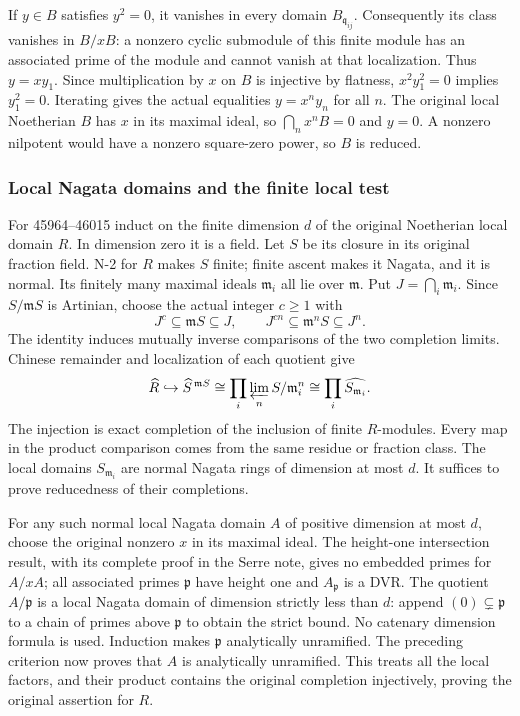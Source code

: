 If \(y\in B\) satisfies \(y^2=0\), it vanishes in every domain \(B_{\mathfrak q_{ij}}\). Consequently its class vanishes in \(B/xB\): a nonzero cyclic submodule of this finite module has an associated prime of the module and cannot vanish at that localization. Thus \(y=xy_1\). Since multiplication by \(x\) on \(B\) is injective by flatness, \(x^2y_1^2=0\) implies \(y_1^2=0\). Iterating gives the actual equalities \(y=x^n y_n\) for all \(n\). The original local Noetherian \(B\) has \(x\) in its maximal ideal, so \(\bigcap_n x^nB=0\) and \(y=0\). A nonzero nilpotent would have a nonzero square-zero power, so \(B\) is reduced.

\subsubsection{Local Nagata domains and the finite local test}\label{local-nagata-domains-and-the-finite-local-test}

For 45964--46015 induct on the finite dimension \(d\) of the original Noetherian local domain \(R\). In dimension zero it is a field. Let \(S\) be its closure in its original fraction field. N-2 for \(R\) makes \(S\) finite; finite ascent makes it Nagata, and it is normal. Its finitely many maximal ideals \(\mathfrak m_i\) all lie over \(\mathfrak m\). Put \(J=\bigcap_i\mathfrak m_i\). Since \(S/\mathfrak mS\) is Artinian, choose the actual integer \(c\geq1\) with \[
 J^c\subseteq\mathfrak mS\subseteq J,
 \qquad J^{cn}\subseteq\mathfrak m^nS\subseteq J^n.
\] The identity induces mutually inverse comparisons of the two completion limits. Chinese remainder and localization of each quotient give \[
 \widehat R\hookrightarrow\widehat S^{\,\mathfrak mS}
 \cong\prod_i\varprojlim_n S/\mathfrak m_i^n
 \cong\prod_i\widehat{S_{\mathfrak m_i}}.
\] The injection is exact completion of the inclusion of finite \(R\)-modules. Every map in the product comparison comes from the same residue or fraction class. The local domains \(S_{\mathfrak m_i}\) are normal Nagata rings of dimension at most \(d\). It suffices to prove reducedness of their completions.

For any such normal local Nagata domain \(A\) of positive dimension at most \(d\), choose the original nonzero \(x\) in its maximal ideal. The height-one intersection result, with its complete proof in the Serre note, gives no embedded primes for \(A/xA\); all associated primes \(\mathfrak p\) have height one and \(A_{\mathfrak p}\) is a DVR. The quotient \(A/\mathfrak p\) is a local Nagata domain of dimension strictly less than \(d\): append \((0)\subsetneq\mathfrak p\) to a chain of primes above \(\mathfrak p\) to obtain the strict bound. No catenary dimension formula is used. Induction makes \(\mathfrak p\) analytically unramified. The preceding criterion now proves that \(A\) is analytically unramified. This treats all the local factors, and their product contains the original completion injectively, proving the original assertion for \(R\).

